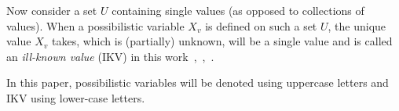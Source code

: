 Now consider a set $U$ containing single values (as opposed to collections of values). When a possibilistic variable $X_{v}$ is defined on such a set $U$, the unique value $X_{v}$ takes, which is (partially) unknown, will be a single value and is called an \emph{ill-known value} (IKV) in this work~\cite{Dubois1988},~\cite{Pons2011},~\cite{Billiet2012}.

In this paper, possibilistic variables will be denoted using uppercase letters and IKV using lower-case letters.






